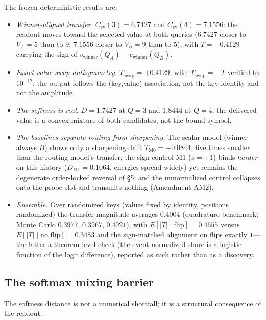 The frozen deterministic results are:

\begin{itemize}
\item \emph{Winner-aligned transfer.} $C_{\mathrm{ev}}(3)=6.7427$ and
$C_{\mathrm{ev}}(4)=7.1556$: the readout moves toward the selected value at
both queries ($6.7427$ closer to $V_A=5$ than to $9$; $7.1556$ closer to
$V_B=9$ than to $5$), with $T=-0.4129$ carrying the sign of
$v_{\mathrm{winner}}(Q_A)-v_{\mathrm{winner}}(Q_B)$.
\item \emph{Exact value-swap antisymmetry.} $T_{\mathrm{swap}}=+0.4129$,
with $T_{\mathrm{swap}}=-T$ verified to $10^{-12}$: the output follows the
(key,value) association, not the key identity and not the amplitude.
\item \emph{The softness is real.} $D=1.7427$ at $Q=3$ and $1.8444$ at
$Q=4$: the delivered value is a convex mixture of both candidates, not the
bound symbol.
\item \emph{The baselines separate routing from sharpening.} The scalar
model (winner always $B$) shows only a sharpening drift
$T_{\mathrm{M0}}=-0.0844$, five times smaller than the routing model's
transfer; the sign control M1 ($s=\pm1$) binds \emph{harder} on this
history ($D_{\mathrm{M1}}=0.1064$, energies spread widely) yet remains the
degenerate order-locked reversal of §5; and the unnormalized control
collapses onto the probe slot and transmits nothing (Amendment AM2).
\item \emph{Ensemble.} Over randomized keys (values fixed by identity,
positions randomized) the transfer magnitude averages $0.4004$
(quadrature benchmark; Monte Carlo $0.3977$, $0.3967$, $0.4021$), with
$E[|T|\mid\text{flip}]=0.4655$ versus $E[|T|\mid\text{no flip}]=0.3483$
and the sign-matched alignment on flips exactly $1$---the latter a
theorem-level check (the event-normalized share is a logistic function of
the logit difference), reported as such rather than as a discovery.
\end{itemize}

\subsection{The softmax mixing barrier}
\label{sec:mixingbarrier}

The softness distance is not a numerical shortfall; it is a structural
consequence of the readout.


